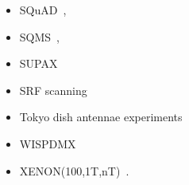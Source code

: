 \documentclass[8pt,twocolumn]{extarticle}
\begin{document}
\begin{mdframed}
\begin{itemize}
\item SQuAD~\cite{Dixit:2020ymh},
\item SQMS~\cite{Cervantes:2022gtv},
\item SUPAX~\cite{Schneemann:2023bqc}
\item SRF scanning~\cite{Tang:2023oid}
\item Tokyo dish antennae experiments~\cite{Suzuki:2015sza,Knirck:2018ojz,Tomita:2020usq}
\item  WISPDMX~\cite{Nguyen:2019xuh}
\item  XENON(100,1T,nT)~\cite{Bloch:2016sjj,Aprile:2019xxb,Aprile:2020tmw, Bloch:2020uzh,XENON:2021myl,An:2020bxd}. 
\end{itemize}
\end{mdframed}


\onecolumn{


}
\end{document}
